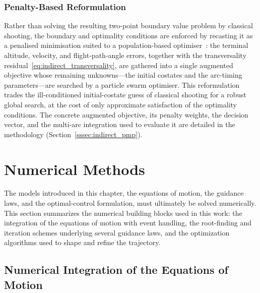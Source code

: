 \subsubsection{Penalty-Based Reformulation}

Rather than solving the resulting two-point boundary value problem by classical shooting, the boundary and optimality conditions are enforced by recasting it as a penalised minimisation suited to a population-based optimiser~\cite{Morgado2022_MultistagePrelimDesignTrajectoryOpt}: the terminal altitude, velocity, and flight-path-angle errors, together with the transversality residual~\eqref{eq:indirect_transversality}, are gathered into a single augmented objective whose remaining unknowns---the initial costates and the arc-timing parameters---are searched by a particle swarm optimiser. This reformulation trades the ill-conditioned initial-costate guess of classical shooting for a robust global search, at the cost of only approximate satisfaction of the optimality conditions. The concrete augmented objective, its penalty weights, the decision vector, and the multi-arc integration used to evaluate it are detailed in the methodology (Section~\ref{sssec:indirect_pmp}).


\section{Numerical Methods}
\label{sec:numerical_methods}

The models introduced in this chapter, the equations of motion, the guidance laws, and the optimal-control formulation, must ultimately be solved numerically. This section summarizes the numerical building blocks used in this work: the integration of the equations of motion with event handling, the root-finding and iteration schemes underlying several guidance laws, and the optimization algorithms used to shape and refine the trajectory.


\subsection{Numerical Integration of the Equations of Motion}
\label{ssec:integration}

